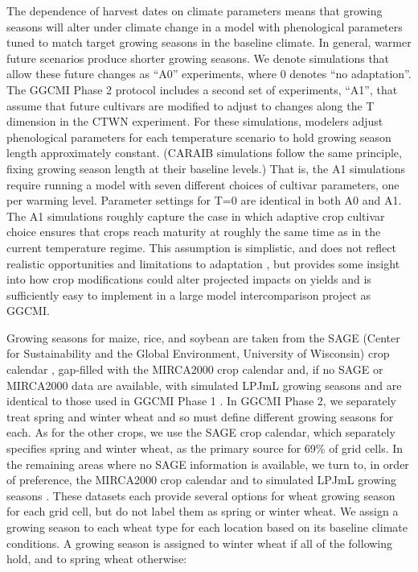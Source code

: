 \documentclass[gmd, manuscript]{copernicus} %
\begin{document}
The dependence of harvest dates on climate parameters means that growing seasons will alter under climate change in a model with phenological parameters tuned to match target growing seasons in the baseline climate. In general, warmer future scenarios produce shorter growing seasons.
We denote simulations that allow these future changes as ``A0'' experiments, where 0 denotes ``no adaptation''. 
 The GGCMI Phase 2 protocol includes a second set of experiments, ``A1'', that assume that future cultivars are modified to adjust to changes along the T dimension in the CTWN experiment.  %
For these simulations, modelers adjust phenological parameters for each temperature scenario to hold growing season length approximately constant. 
(CARAIB simulations follow the same principle, fixing growing season length at their baseline levels.) 
That is, the A1 simulations require running a model with seven different choices of cultivar parameters, one per warming level. Parameter settings for T=0 are identical in both A0 and A1. 
The A1 simulations roughly capture the case in which adaptive crop cultivar choice ensures that crops reach maturity at roughly the same time as in the current temperature regime. 
This assumption is simplistic, and does not reflect realistic opportunities and limitations to adaptation \citep{vadez2012adaptation,challinor2018improving}, but provides some insight into how crop modifications could alter projected impacts on yields and is sufficiently easy to implement in a large model intercomparison project as GGCMI.

Growing seasons for maize, rice, and soybean are taken from the SAGE (Center for Sustainability and the Global Environment, University of Wisconsin) crop calendar \citep{Sacks2010}, gap-filled with the MIRCA2000 crop calendar \citep{Portmann2010} and, if no SAGE or MIRCA2000 data are available, with simulated LPJmL growing seasons \citep{waha2012climate} and are identical to those used in GGCMI Phase 1 \citep{Elliott2015}.
In GGCMI Phase 2, we separately treat spring and winter wheat and so must define different growing seasons for each.
As for the other crops, we use the SAGE crop calendar, which separately specifies spring and winter wheat, as the primary source for 69\% of grid cells. 
In the remaining areas where no SAGE information is available, we turn to, in order of preference, the MIRCA2000 crop calendar \citep{Portmann2010} and to simulated LPJmL growing seasons \citep{waha2012climate}.  
These datasets each provide several options for wheat growing season for each grid cell, but do not label them as spring or winter wheat. 
We assign a growing season to each wheat type for each location based on its baseline climate conditions. 
A growing season is assigned to winter wheat if all of the following hold, and to spring wheat otherwise:
\end{document}
